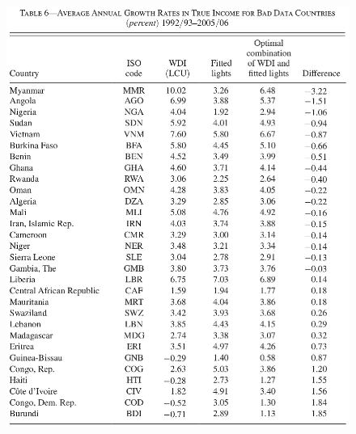 \documentclass{beamer}
\begin{document}
\begin{frame}
  \begin{figure}
    \includegraphics[scale=.5]{henderson_et_al3.eps}
  \end{figure}
\end{frame}


\end{document}
